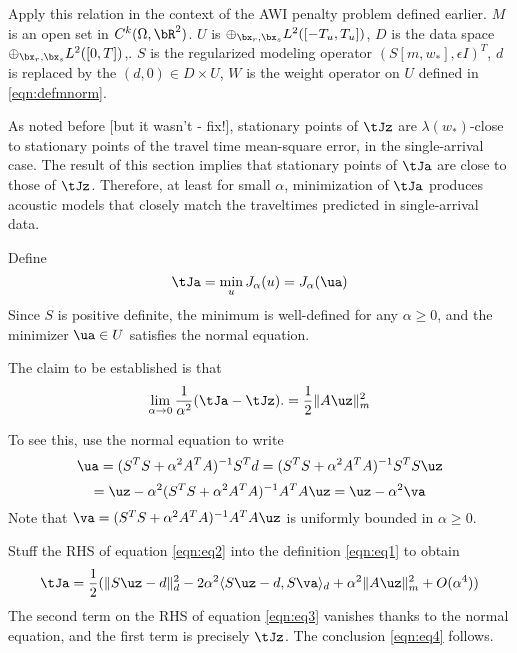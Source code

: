 Apply this relation in the context of the AWI penalty problem defined earlier. $M$ is an open set in $C^k(\Omega, \bR^2)$. $U$ is $\oplus_{\bx_r,\bx_s}L^2([-T_u,T_u])$, $D$ is the data space $\oplus_{\bx_r,\bx_s}L^2([0,T])$,. $S$ is the regularized modeling operator $(S[m,w_*],\epsilon I)^T$, $d$ is replaced by the $(d,0) \in D \times U$,  $W$ is the weight operator on $U$ defined in \ref{eqn:defmnorm}.

As noted before [but it wasn't - fix!], stationary points of $\tJz$ are $\lambda(w_*)$-close to stationary points of the travel time mean-square error, in the single-arrival case. The result of this section implies that stationary points of $\tJa$ are close to those of $\tJz$. Therefore, at least for small $\alpha$, minimization of $\tJa$ produces acoustic models that closely match the traveltimes predicted in single-arrival data.


Define
\begin{equation}
  \label{eqn:eq0}
  \tJa = \min_u J_{\alpha}(u) = J_{\alpha}(\ua)
\end{equation}
Since $S$ is positive definite, the minimum is well-defined for any $\alpha \ge 0$, and the minimizer $\ua \in U$ satisfies the normal equation.

The claim to be established is that
\begin{equation}
  \label{eqn:eq4}
  \lim_{\alpha \rightarrow 0} \frac{1}{\alpha^2}  (\tJa-\tJz).= \frac{1}{2}\|A\uz\|_m^2
\end{equation}

To see this, use the normal equation to write
\[
  \ua = (S^TS + \alpha^2 A^TA)^{-1}S^Td = (S^TS + \alpha^2 A^TA)^{-1}S^TS \uz
\]
\begin{equation}
  \label{eqn:eq2}
  = \uz - \alpha^2 (S^TS + \alpha^2 A^TA)^{-1}A^TA\uz = \uz-\alpha^2 \va
\end{equation}
Note that $\va = (S^TS + \alpha^2 A^TA)^{-1}A^TA\uz$ is uniformly bounded in $\alpha \ge 0$.

Stuff the RHS of equation \ref{eqn:eq2} into the definition \ref{eqn:eq1} to obtain
\begin{equation}
  \label{eqn:eq3}
  \tJa = \frac{1}{2}(\|S\uz-d\|_d^2 - 2 \alpha^2\langle S\uz-d, S\va\rangle_d + \alpha^2\|A\uz\|_m^2 + O(\alpha^4))
\end{equation}
The second term on the RHS of equation \ref{eqn:eq3} vanishes thanks to the normal equation, and the first term is precisely $\tJz$. The conclusion \ref{eqn:eq4} follows.




